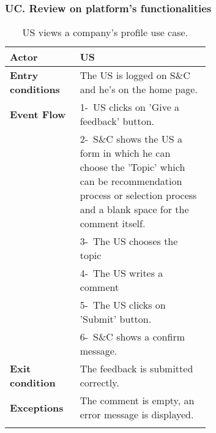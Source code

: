 \subsubsection*{UC\cuc . Review on platform's functionalities}
\begin{center}
    \begin{longtable}{|l|p{0.65\linewidth}|}
        \hline
        \textbf{Actor}            & US \\
        \hline
        \textbf{Entry conditions} & The US is logged on S\&C and he's on the home page. \\
        \hline
        \textbf{Event Flow}       & 1-\ US clicks on 'Give a feedback' button.  \\
        & 2-\ S\&C shows the US a form in which he can choose the 'Topic' which can be recommendation process or selection process and a blank space for the comment itself. \\
        & 3-\ The US chooses the topic \\
        & 4-\ The US writes a comment\\
        & 5-\ The US clicks on 'Submit' button.  \\
        & 6-\ S\&C shows a confirm message.\\
        \hline
        \textbf{Exit condition}   &  The feedback is submitted correctly. \\
        \hline
        \textbf{Exceptions}       & The comment is empty, an error message is displayed. \\
        \hline
        \caption{US views a company's profile use case.}
        \label{tab: cp_use_case}
    \end{longtable}
\end{center}

